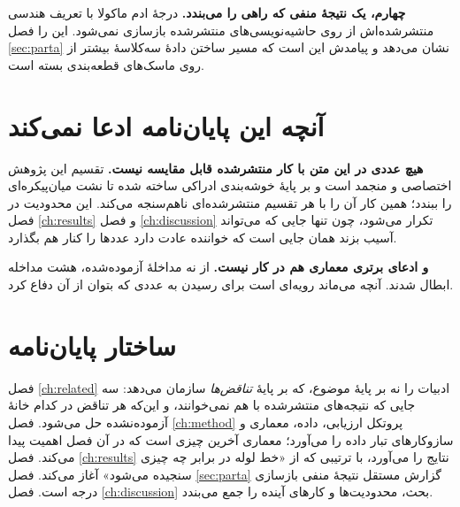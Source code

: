 \textbf{چهارم، یک نتیجهٔ منفی که راهی را می‌بندد.} درجهٔ ادم ماکولا با تعریف هندسی منتشرشده‌اش
از روی حاشیه‌نویسی‌های منتشرشده بازسازی نمی‌شود. این را فصل \ref{sec:parta} نشان می‌دهد و
پیامدش این است که مسیر ساختن دادهٔ سه‌کلاسهٔ بیشتر از روی ماسک‌های قطعه‌بندی بسته است.

\section{آنچه این پایان‌نامه ادعا نمی‌کند}

\textbf{هیچ عددی در این متن با کار منتشرشده قابل مقایسه نیست.} تقسیم این پژوهش اختصاصی و
منجمد است و بر پایهٔ خوشه‌بندی ادراکی ساخته شده تا نشت میان‌پیکره‌ای را ببندد؛ همین کار آن را
با هر تقسیم منتشرشده‌ای ناهم‌سنجه می‌کند. این محدودیت در فصل \ref{ch:results} و فصل
\ref{ch:discussion} تکرار می‌شود، چون تنها جایی که می‌تواند آسیب بزند همان جایی است که
خواننده عادت دارد عددها را کنار هم بگذارد.

\textbf{و ادعای برتری معماری هم در کار نیست.} از نه مداخلهٔ آزموده‌شده، هشت مداخله ابطال شدند.
آنچه می‌ماند رویه‌ای است برای رسیدن به عددی که بتوان از آن دفاع کرد.

\section{ساختار پایان‌نامه}

فصل \ref{ch:related} ادبیات را نه بر پایهٔ موضوع، که بر پایهٔ \emph{تناقض‌ها} سازمان می‌دهد:
سه جایی که نتیجه‌های منتشرشده با هم نمی‌خوانند، و این‌که هر تناقض در کدام خانهٔ آزموده‌نشده
حل می‌شود. فصل \ref{ch:method} پروتکل ارزیابی، داده، معماری و سازوکارهای تبار داده را می‌آورد؛
معماری آخرین چیزی است که در آن فصل اهمیت پیدا می‌کند. فصل \ref{ch:results} نتایج را می‌آورد،
با ترتیبی که از «خط لوله در برابر چه چیزی سنجیده می‌شود» آغاز می‌کند. فصل \ref{sec:parta}
گزارش مستقل نتیجهٔ منفی بازسازی درجه است. فصل \ref{ch:discussion} بحث، محدودیت‌ها و کارهای
آینده را جمع می‌بندد.

